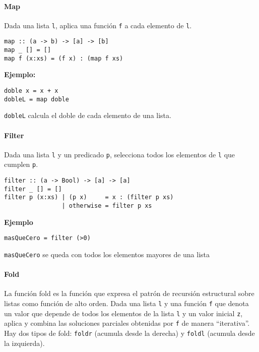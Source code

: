 \paragraph{Map}
Dada una lista \texttt{l}, aplica una función \texttt{f} a cada elemento de \texttt{l}.
\begin{centrado}
	\begin{verbatim}
map :: (a -> b) -> [a] -> [b]
map _ [] = []
map f (x:xs) = (f x) : (map f xs)
	\end{verbatim}
\end{centrado} 

\textbf{Ejemplo:}
\begin{centrado}
	\begin{verbatim}
doble x = x + x
dobleL = map doble  
	\end{verbatim}
\end{centrado} 

\texttt{dobleL} calcula el doble de cada elemento de una lista.

\paragraph{Filter}
Dada una lista \texttt{l} y un predicado \texttt{p}, selecciona todos los elementos de \texttt{l} que cumplen \texttt{p}.

\begin{centrado}
	\begin{verbatim}
filter :: (a -> Bool) -> [a] -> [a]
filter _ [] = []
filter p (x:xs) | (p x)     = x : (filter p xs)
                | otherwise = filter p xs  
	\end{verbatim}
\end{centrado}

\textbf{Ejemplo}
\begin{centrado}
	\begin{verbatim}
masQueCero = filter (>0)
	\end{verbatim}
\end{centrado}

\texttt{masQueCero} se queda con todos los elementos mayores de una lista

\paragraph{Fold}
La función {fold} es la función que expresa el patrón de recursión estructural sobre listas como función de alto orden. Dada una lista \texttt{l} y una función \texttt{f} que denota un valor que depende de todos los elementos de la lista \texttt{l} y un valor inicial \texttt{z}, aplica y combina las soluciones parciales obtenidas por \texttt{f} de manera  ``iterativa''. 
Hay dos tipos de fold: \texttt{foldr} (acumula desde la derecha) y \texttt{foldl} (acumula desde la izquierda).

